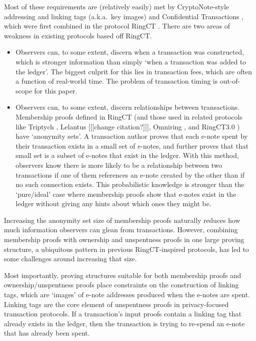 Most of these requirements are (relatively easily) met by CryptoNote-style addressing and linking tags (a.k.a.\ key images) \cite{cryptoNoteWhitePaper} and Confidential Transactions \cite{maxwell-ct-2}, which were first combined in the protocol RingCT \cite{MRL-0005-ringct}. There are two areas of weakness in existing protocols based off RingCT.

\begin{itemize}
    \item Observers can, to some extent, discern when a transaction was constructed, which is stronger information than simply `when a transaction was added to the ledger'. The biggest culprit for this lies in transaction fees, which are often a function of real-world time. The problem of transaction timing is out-of-scope for this paper.
    \item Observers can, to some extent, discern relationships between transactions. Membership proofs defined in RingCT (and those used in related protocols like Triptych \cite{triptych-preprint}, Lelantus \cite{lelantus-preprint} [[[change citation?]]], Omniring \cite{omniring-paper}, and RingCT3.0 \cite{ringct3-preprint}) have `anonymity sets'. A transaction author proves that each e-note spent by their transaction exists in a small set of e-notes, and further proves that that small set is a subset of e-notes that exist in the ledger. With this method, observers know there is more likely to be a relationship between two transactions if one of them references an e-note created by the other than if no such connection exists. This probabilistic knowledge is stronger than the `pure/ideal' case where membership proofs show that e-notes exist in the ledger without giving any hints about which ones they might be.
\end{itemize}

Increasing the anonymity set size of membership proofs naturally reduces how much information observers can glean from transactions. However, combining membership proofs with ownership and unspentness proofs in one large proving structure, a ubiquitous pattern in previous RingCT-inspired protocols, has led to some challenges around increasing that size.

Most importantly, proving structures suitable for both membership proofs and ownership/unspentness proofs place constraints on the construction of linking tags, which are `images' of e-note addresses produced when the e-notes are spent. Linking tags are the core element of unspentness proofs in privacy-focused transaction protocols. If a transaction's input proofs contain a linking tag that already exists in the ledger, then the transaction is trying to re-spend an e-note that has already been spent.

